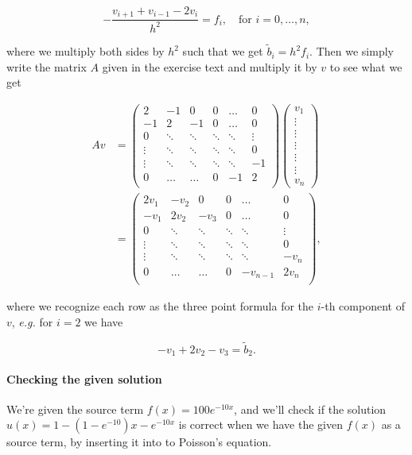 \documentclass[english, 11pt]{article}
\begin{document}
$$ -\frac{v_{i+1} + v_{i-1} - 2v_i}{h^2} = f_i, \quad \text{for } i=0,\ldots,n, $$

where we multiply both sides by $h^2$ such that we get $ \tilde b_i = h^2 f_i$. Then we simply write the matrix $A$ given in the exercise text and multiply it by $v$ to see what we get

\begin{align*}
	Av &=
	\left(\begin{matrix}
		2 & -1 & 0 & 0 &\ldots & 0 \\	
		-1 & 2 & -1 & 0 & \ldots & 0 \\
		0 & \ddots & \ddots & \ddots & \ddots & \vdots \\
		\vdots & \ddots & \ddots & \ddots & \ddots & 0 \\
		\vdots & \ddots & \ddots & \ddots & \ddots & -1 \\
		0 & \ldots & \ldots & 0 & -1 & 2 \\
	\end{matrix}\right)\left(
	\begin{matrix}
		v_1 \\ \vdots\\ \vdots \\ \vdots \\ \vdots \\ \vdots \\ v_n 
	\end{matrix} \right) \\
	&= \left(\begin{matrix}
		2v_1 & -v_2 & 0 & 0 &\ldots & 0 \\	
		-v_1 & 2v_2 & -v_3 & 0 & \ldots & 0 \\
		0 & \ddots & \ddots & \ddots & \ddots & \vdots \\
		\vdots & \ddots & \ddots & \ddots & \ddots & 0 \\
		\vdots & \ddots & \ddots & \ddots & \ddots & -v_n \\
		0 & \ldots & \ldots & 0 & -v_{n-1} & 2v_n \\
	\end{matrix}\right),
\end{align*}

where we recognize each row as the three point formula for the $i$-th component of $v$, \emph{e.g.} for $i=2$ we have

$$ -v_1 + 2v_2 -v_3 = \tilde b_2.$$

\paragraph{Checking the given solution}
We're given the source term $f(x) = 100 e^{-10x}$, and we'll check if the solution $u(x) = 1-(1-e^{-10})x - e^{-10x}$ is correct when we have the given $f(x)$ as a source term, by inserting it into to Poisson's equation.
\end{document}
